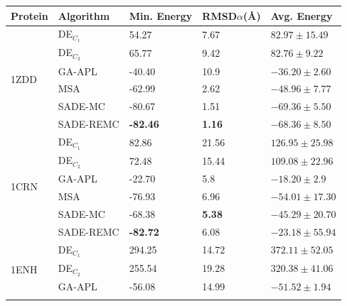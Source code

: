 \begin{table}[ht!]
  \centering
  \begin{tabular}{ l | l | l | l | l }
    \hline \hline
Protein              & Algorithm    & Min. Energy         & RMSD$\alpha$({\AA}) & Avg. Energy             \\ \hline \hline
\multirow{6}{*}{1ZDD}& DE$_{C_1}   $& 54.27               & 7.67              & $82.97\pm15.49     $      \\ \cline{2-5}
                     & DE$_{C_2}   $& 65.77               & 9.42              & $82.76\pm9.22      $      \\ \cline{2-5}
                     & GA-APL       & -40.40              & 10.9              & $-36.20\pm2.60$           \\ \cline{2-5}
                     & MSA          & -62.99              & 2.62              & $-48.96\pm7.77$           \\ \cline{2-5}
                     & SADE-MC      & -80.67              & 1.51              & $\bm{-69.36 \pm 5.50}$    \\ \cline{2-5}
                     & SADE-REMC    & \textbf{-82.46}     & \textbf{1.16}     & $-68.36 \pm 8.50$         \\ \hline \hline
\multirow{6}{*}{1CRN}& DE$_{C_1}   $& 82.86               & 21.56             & $126.95\pm25.98    $      \\ \cline{2-5}
                     & DE$_{C_2}   $& 72.48               & 15.44             & $109.08\pm22.96  $        \\ \cline{2-5}
                     & GA-APL       & -22.70              & 5.8               & $-18.20\pm2.9$            \\ \cline{2-5}
                     & MSA          & -76.93              & 6.96              & $\bm{-54.01\pm17.30}$     \\ \cline{2-5}
                     & SADE-MC      & -68.38              & \textbf{5.38}     & $-45.29 \pm 20.70$        \\ \cline{2-5}
                     & SADE-REMC    & \textbf{-82.72}     & 6.08              & $-23.18 \pm 55.94$        \\ \hline \hline
\multirow{6}{*}{1ENH}& DE$_{C_1}   $& 294.25              & 14.72             & $372.11\pm52.05    $      \\ \cline{2-5}
                     & DE$_{C_2}   $& 255.54              & 19.28             & $320.38\pm41.06    $      \\ \cline{2-5}
                     & GA-APL       & -56.08              & 14.99             & $-51.52\pm1.94$           \\ \cline{2-5}

\end{tabular}
\end{table}
